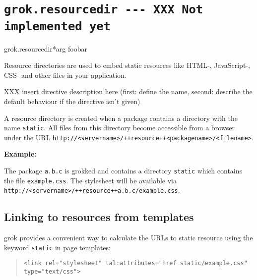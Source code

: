 \documentclass[10pt,a4paper,english]{manual}
\newlength{\admonitionwidth}
\begin{document}
\section{\texttt{grok.resourcedir -{}-{}- XXX Not implemented yet}}
\begin{funcdesc}{grok.resourcedir}{*arg}
foobar

Resource directories are used to embed static resources like HTML-,
JavaScript-, CSS- and other files in your application.

XXX insert directive description here (first: define the name,
second: describe the default behaviour if the directive isn't
given)

A resource directory is created when a package contains a directory
with the name \texttt{static}. All files from this directory become
accessible from a browser under the URL
\texttt{http://<servername>/++resource++<packagename>/<filename>}.

\textbf{Example:}

The package \texttt{a.b.c} is grokked and contains a directory
\texttt{static} which contains the file \texttt{example.css}. The
stylesheet will be available via
\texttt{http://<servername>/++resource++a.b.c/example.css}.
\end{funcdesc}
\begin{center}\begin{sffamily}
\end{sffamily}
\end{center}



\subsection{Linking to resources from templates}

grok provides a convenient way to calculate the URLs to static
resource using the keyword \texttt{static} in page templates:
\begin{quote}\begin{verbatim}
<link rel="stylesheet" tal:attributes="href static/example.css" type="text/css">
\end{verbatim}\end{quote}
\end{document}
